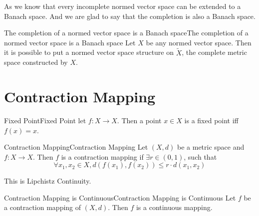 \documentclass[../main.tex]{subfiles}
\begin{document}
As we know that every incomplete normed vector space can be extended to a Banach space. And we are glad to say that the completion is also a Banach space.

\begin{theorem}{The completion of a normed vector space is a Banach space}{The completion of a normed vector space is a Banach space}
Let $X$ be any normed vector space. Then it is possible to put a normed vector space structure on $\tilde{X}$, the complete metric space constructed by $X$.
\end{theorem}


\section{Contraction Mapping}
\begin{definition}{Fixed Point}{Fixed Point}
let  $f: X \rightarrow X$. Then a point $x\in X$ is a fixed point iff $f(x)=x$.
\end{definition}

\begin{definition}{Contraction Mapping}{Contraction Mapping}
Let $(X,d)$ be a metric space and $f:X \rightarrow X$. Then $f$ is a contraction mapping if $\exists r\in (0,1)$, such that
\begin{equation}
\forall x_1,x_2\in X,d(f(x_1),f(x_2)) \leq r \cdot d(x_1,x_2)
\end{equation}
\end{definition}
This is Lipchistz Continuity.

\begin{proposition}{Contraction Mapping is Continuous}{Contraction Mapping is Continuous}
Let $f$ be a contraction mapping of $(X,d)$. Then $f$ is a continuous mapping.
\end{proposition}
\end{document}
